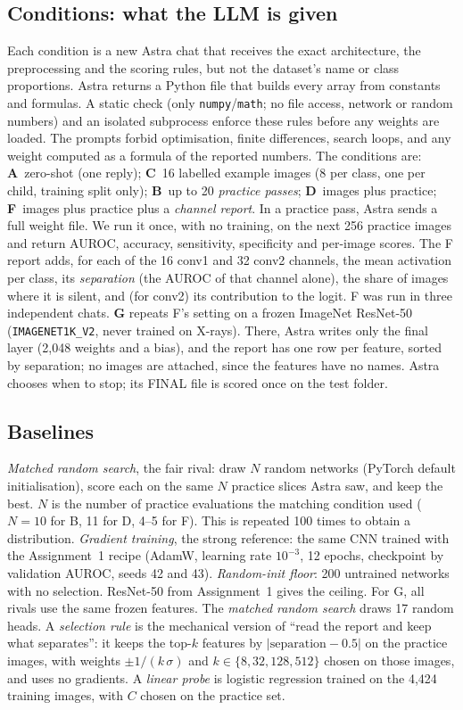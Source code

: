 \subsection{Conditions: what the LLM is given}
Each condition is a new Astra chat that receives the exact architecture, the preprocessing and the scoring rules, but not the dataset's name or class proportions.
Astra returns a Python file that builds every array from constants and formulas.
A static check (only \texttt{numpy}/\texttt{math}; no file access, network or random numbers) and an isolated subprocess enforce these rules before any weights are loaded.
The prompts forbid optimisation, finite differences, search loops, and any weight computed as a formula of the reported numbers.
The conditions are:
\textbf{A}~zero-shot (one reply);
\textbf{C}~16 labelled example images (8 per class, one per child, training split only);
\textbf{B}~up to 20 \emph{practice passes};
\textbf{D}~images plus practice;
\textbf{F}~images plus practice plus a \emph{channel report}.
In a practice pass, Astra sends a full weight file.
We run it once, with no training, on the next 256 practice images and return AUROC, accuracy, sensitivity, specificity and per-image scores.
The F report adds, for each of the 16 conv1 and 32 conv2 channels, the mean activation per class, its \emph{separation} (the AUROC of that channel alone), the share of images where it is silent, and (for conv2) its contribution to the logit.
F was run in three independent chats.
\textbf{G} repeats F's setting on a frozen ImageNet ResNet-50 (\texttt{IMAGENET1K\_V2}, never trained on X-rays).
There, Astra writes only the final layer (2,048 weights and a bias), and the report has one row per feature, sorted by separation; no images are attached, since the features have no names.
Astra chooses when to stop; its FINAL file is scored once on the test folder.

\subsection{Baselines}
\emph{Matched random search}, the fair rival: draw $N$ random networks (PyTorch default initialisation), score each on the same $N$ practice slices Astra saw, and keep the best.
$N$ is the number of practice evaluations the matching condition used ($N{=}10$ for B, 11 for D, 4--5 for F).
This is repeated 100 times to obtain a distribution.
\emph{Gradient training}, the strong reference: the same CNN trained with the Assignment~1 recipe (AdamW, learning rate $10^{-3}$, 12 epochs, checkpoint by validation AUROC, seeds 42 and 43).
\emph{Random-init floor}: 200 untrained networks with no selection.
ResNet-50 from Assignment~1 gives the ceiling.
For G, all rivals use the same frozen features.
The \emph{matched random search} draws 17 random heads.
A \emph{selection rule} is the mechanical version of ``read the report and keep what separates'': it keeps the top-$k$ features by $|\mathrm{separation}-0.5|$ on the practice images, with weights $\pm1/(k\,\sigma)$ and $k\in\{8,32,128,512\}$ chosen on those images, and uses no gradients.
A \emph{linear probe} is logistic regression trained on the 4,424 training images, with $C$ chosen on the practice set.

